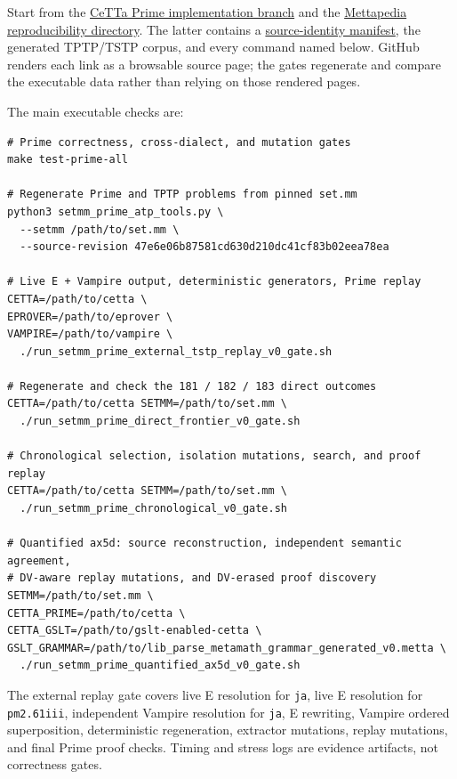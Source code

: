 \documentclass[10pt]{article}
\begin{document}
Start from the
\href{https://github.com/zariuq/CeTTa/tree/cetta-he-prime-dtt-chainer-20260715}
{CeTTa Prime implementation branch} and the
\href{https://github.com/zariuq/MeTTapedia/tree/prime-atp-pcxp-20260718/MettaKernel/kernel/pcxp_trace_certification}
{Mettapedia reproducibility directory}.  The latter contains a
\href{https://github.com/zariuq/MeTTapedia/blob/prime-atp-pcxp-20260718/MettaKernel/kernel/pcxp_trace_certification/setmm_prime_atp_manifest.json}
{source-identity manifest}, the generated TPTP/TSTP corpus, and every command
named below.  GitHub renders each link as a browsable source page; the gates
regenerate and compare the executable data rather than relying on those
rendered pages.

The main executable checks are:

\begin{lstlisting}
# Prime correctness, cross-dialect, and mutation gates
make test-prime-all

# Regenerate Prime and TPTP problems from pinned set.mm
python3 setmm_prime_atp_tools.py \
  --setmm /path/to/set.mm \
  --source-revision 47e6e06b87581cd630d210dc41cf83b02eea78ea

# Live E + Vampire output, deterministic generators, Prime replay
CETTA=/path/to/cetta \
EPROVER=/path/to/eprover \
VAMPIRE=/path/to/vampire \
  ./run_setmm_prime_external_tstp_replay_v0_gate.sh

# Regenerate and check the 181 / 182 / 183 direct outcomes
CETTA=/path/to/cetta SETMM=/path/to/set.mm \
  ./run_setmm_prime_direct_frontier_v0_gate.sh

# Chronological selection, isolation mutations, search, and proof replay
CETTA=/path/to/cetta SETMM=/path/to/set.mm \
  ./run_setmm_prime_chronological_v0_gate.sh

# Quantified ax5d: source reconstruction, independent semantic agreement,
# DV-aware replay mutations, and DV-erased proof discovery
SETMM=/path/to/set.mm \
CETTA_PRIME=/path/to/cetta \
CETTA_GSLT=/path/to/gslt-enabled-cetta \
GSLT_GRAMMAR=/path/to/lib_parse_metamath_grammar_generated_v0.metta \
  ./run_setmm_prime_quantified_ax5d_v0_gate.sh
\end{lstlisting}

The external replay gate covers live E resolution for \texttt{ja}, live E
resolution for \texttt{pm2.61iii}, independent Vampire resolution for
\texttt{ja}, E rewriting, Vampire ordered superposition, deterministic
regeneration, extractor mutations, replay mutations, and final Prime proof
checks.  Timing and stress logs are evidence artifacts, not correctness gates.
\end{document}
